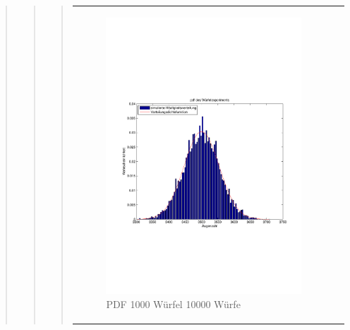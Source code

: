 \begin{quote}
\begin{quote}
\begin{quote}
\begin{center}
\begin{tabular}{ll}
            \hspace{-28em}
                \begin{minipage}{0.6\textwidth}

                    \begin{figure}[H]
                        \label{fig:}
                        \includegraphics[scale=0.5, trim = 2cm 6.5cm 1.5cm 8.5cm, clip]{./Bilder/1000wuerfelpdf} %
                        \caption{PDF 1000 Würfel 10000 Würfe}
                    \end{figure}

                \end{minipage}

            \end{tabular}
            \end{center}			
			

\end{quote}
\end{quote}
\end{quote}
